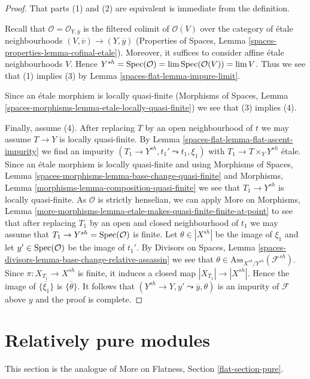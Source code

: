 \begin{proof}
That parts (1) and (2) are equivalent is immediate from the definition.

\medskip\noindent
Recall that $\mathcal{O} = \mathcal{O}_{Y, \overline{y}}$
is the filtered colimit of $\mathcal{O}(V)$ over the category
of \'etale neighbourhoods $(V, \overline{v}) \to (Y, \overline{y})$
(Properties of Spaces, Lemma \ref{spaces-properties-lemma-cofinal-etale}).
Moreover, it suffices to consider affine \'etale neighbourhoods $V$.
Hence $Y^{sh} = \operatorname{Spec}(\mathcal{O}) = \lim \operatorname{Spec}(\mathcal{O}(V)) = \lim V$.
Thus we see that (1) implies (3) by Lemma \ref{spaces-flat-lemma-impure-limit}.

\medskip\noindent
Since an \'etale morphism is locally quasi-finite
(Morphisms of Spaces, Lemma
\ref{spaces-morphisms-lemma-etale-locally-quasi-finite})
we see that (3) implies (4).

\medskip\noindent
Finally, assume (4). After replacing $T$ by an open neighbourhood of $t$
we may assume $T \to Y$ is locally quasi-finite.
By Lemma \ref{spaces-flat-lemma-flat-ascent-impurity}
we find an impurity
$(T_1 \to Y^{sh}, t_1' \leadsto t_1, \xi_1)$
with $T_1 \to T \times_Y Y^{sh}$
\'etale. Since an \'etale morphism is locally quasi-finite
and using Morphisms of Spaces, Lemma
\ref{spaces-morphisms-lemma-base-change-quasi-finite} and
Morphisms, Lemma \ref{morphisms-lemma-composition-quasi-finite}
we see that $T_1 \to Y^{sh}$ is locally quasi-finite.
As $\mathcal{O}$ is strictly henselian, we can apply More on Morphisms, Lemma
\ref{more-morphisms-lemma-etale-makes-quasi-finite-finite-at-point}
to see that after replacing $T_1$ by an open and closed neighbourhood
of $t_1$ we may assume that $T_1 \to Y^{sh} = \operatorname{Spec}(\mathcal{O})$
is finite. Let $\theta \in |X^{sh}|$ be the image of
$\xi_1$ and let $y' \in \operatorname{Spec}(\mathcal{O})$ be the image
of $t_1'$. By Divisors on Spaces, Lemma
\ref{spaces-divisors-lemma-base-change-relative-assassin}
we see that $\theta \in \text{Ass}_{X^{sh}/Y^{sh}}(\mathcal{F}^{sh})$.
Since $\pi : X_{T_1} \to X^{sh}$
is finite, it induces a closed map $|X_{T_1}| \to |X^{sh}|$.
Hence the image of $\overline{\{\xi_1\}}$ is $\overline{\{\theta\}}$.
It follows that $(Y^{sh} \to Y, y' \leadsto \overline{y}, \theta)$
is an impurity of $\mathcal{F}$ above $y$ and the proof is complete.
\end{proof}

\section{Relatively pure modules}
\label{spaces-flat-section-pure}
This section is the analogue of
More on Flatness, Section \ref{flat-section-pure}.

